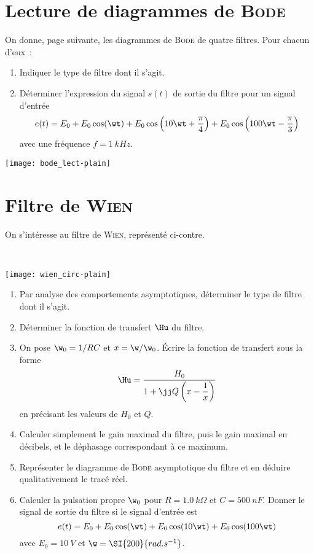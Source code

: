 \documentclass[a4paper, 12pt, final, garamond]{book}
\begin{document}
\section{Lecture de diagrammes de \textsc{Bode}}
On donne, page suivante, les diagrammes de \textsc{Bode} de quatre filtres. Pour
chacun d'eux~:
\begin{enumerate}
	\item Indiquer le type de filtre dont il s'agit.
	\item Déterminer l'expression du signal $s(t)$ de sortie du filtre pour un
	      signal d'entrée
	      \[e(t) =
		      E_0 +
		      E_0\cos(\wt) +
		      E_0\cos \left( 10\wt + \frac{\pi}{4} \right) +
		      E_0\cos \left( 100\wt - \frac{\pi}{3} \right)
	      \]
	      avec une fréquence $f = \SI{1}{kHz}$.
\end{enumerate}
\begin{center}
	\texttt{[image: bode\_lect-plain]}
\end{center}

\section{Filtre de \textsc{Wien}}
\noindent
\begin{minipage}[c]{.3\linewidth}
	On s'intéresse au filtre de \textsc{Wien}, représenté ci-contre.
\end{minipage}
\hfill
\begin{minipage}[c]{.7\linewidth}
	~
	\begin{center}
		\texttt{[image: wien\_circ-plain]}
	\end{center}
\end{minipage}

\begin{enumerate}
	\item Par analyse des comportements asymptotiques, déterminer le type de
	      filtre dont il s'agit.
	\item Déterminer la fonction de transfert $\Hu$ du filtre.
	\item On pose $\w_0 = 1/RC$ et $x=\w/\w_0$. Écrire la fonction de transfert
	      sous la forme
	      \[ \Hu = \frac{H_0}{1 + \jj Q \left( x - \dfrac{1}{x} \right)}\]
	      en précisant les valeurs de $H_0$ et $Q$.
	\item Calculer simplement le gain maximal du filtre, puis le gain maximal en
	      décibels, et le déphasage correspondant à ce maximum.
	\item Représenter le diagramme de \textsc{Bode} asymptotique du filtre et en
	      déduire qualitativement le tracé réel.
	\item Calculer la pulsation propre $\w_0$ pour $R = \SI{1.0}{k\Omega}$ et $C
		      = \SI{500}{nF}$. Donner le signal de sortie du filtre si le signal
	      d'entrée est
	      \[e(t) = E_0 + E_0\cos(\wt) + E_0\cos(10\wt) + E_0\cos(100\wt)\]
	      avec $E_0 = \SI{10}{V}$ et $\w = \SI{200}{rad.s^{-1}}$.
\end{enumerate}
\end{document}

